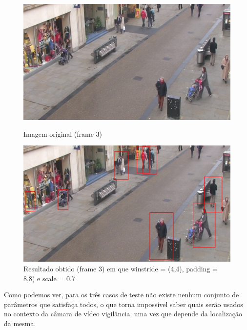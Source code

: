 \begin{figure}[h]
	\centering
	\begin{minipage}[b]{0.49\textwidth}
		\centering
		\includegraphics[width=\textwidth]{img/vision/exemplos/frame3.png}
		\caption{Imagem original (frame 3) \newline \newline}
		\label{bluetth05-res}
	\end{minipage}
	\hfill
	\begin{minipage}[b]{0.49\textwidth}
		\centering
		\includegraphics[width=\textwidth]{img/vision/exemplos/result_frame3.jpg}
		\caption{Resultado obtido (frame 3) em que winstride = (4,4), padding = 8,8) e scale = 0.7}
		\label{comimageesquema}
	\end{minipage}
\end{figure}



Como podemos ver, para os três casos de teste não existe nenhum conjunto de parâmetros que satisfaça todos, o que torna impossível saber quais serão usados no contexto da câmara de vídeo vigilância, uma vez que depende da localização da mesma.  














